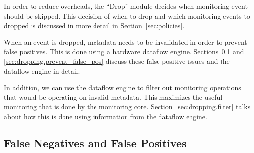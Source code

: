 In order to reduce overheads, the ``Drop'' module decides when monitoring event
should be skipped.  This decision of when to drop and which monitoring events
to dropped is discussed in more detail in Section~\ref{sec:policies}.

When an event is dropped, metadata needs to be invalidated in order to prevent
false positives. This is done using a hardware dataflow engine.
Sections~\ref{sec:dropping.false_neg_pos} and
\ref{sec:dropping.prevent_false_pos} discuss these false positive issues and
the dataflow engine in detail. 

In addition, we can use the dataflow engine to filter out monitoring operations
that would be operating on invalid metadata. This maximizes the useful
monitoring that is done by the monitoring core.
Section~\ref{sec:dropping.filter} talks about how this is done using
information from the dataflow engine.

\subsection{False Negatives and False Positives}
\label{sec:dropping.false_neg_pos}

